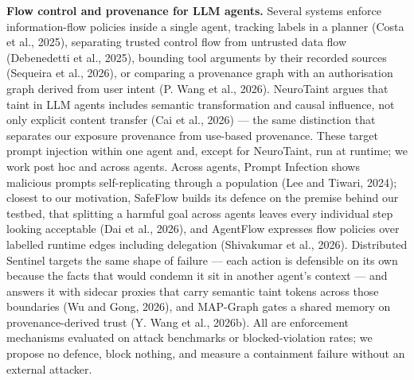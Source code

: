 \documentclass[11pt, a4paper]{article}
\begin{document}
\textbf{Flow control and provenance for LLM agents.} Several systems enforce information-flow policies inside a single agent, tracking labels in a planner (Costa et al., 2025), separating trusted control flow from untrusted data flow (Debenedetti et al., 2025), bounding tool arguments by their recorded sources (Sequeira et al., 2026), or comparing a provenance graph with an authorisation graph derived from user intent (P. Wang et al., 2026). NeuroTaint argues that taint in LLM agents includes semantic transformation and causal influence, not only explicit content transfer (Cai et al., 2026) --- the same distinction that separates our exposure provenance from use-based provenance. These target prompt injection within one agent and, except for NeuroTaint, run at runtime; we work post hoc and across agents. Across agents, Prompt Infection shows malicious prompts self-replicating through a population (Lee and Tiwari, 2024); closest to our motivation, SafeFlow builds its defence on the premise behind our testbed, that splitting a harmful goal across agents leaves every individual step looking acceptable (Dai et al., 2026), and AgentFlow expresses flow policies over labelled runtime edges including delegation (Shivakumar et al., 2026). Distributed Sentinel targets the same shape of failure --- each action is defensible on its own because the facts that would condemn it sit in another agent's context --- and answers it with sidecar proxies that carry semantic taint tokens across those boundaries (Wu and Gong, 2026), and MAP-Graph gates a shared memory on provenance-derived trust (Y. Wang et al., 2026b). All are enforcement mechanisms evaluated on attack benchmarks or blocked-violation rates; we propose no defence, block nothing, and measure a containment failure without an external attacker.
\end{document}
